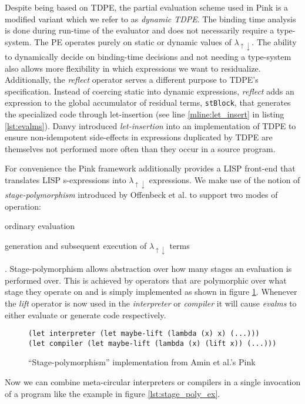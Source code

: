 \documentclass[a4paper,12pt,twoside,openright]{report}
\theoremstyle{definition}
\newcommand{\mslang}{$\lambda_{\uparrow\downarrow}$}
\begin{document}
Despite being based on TDPE, the partial evaluation scheme used in Pink is a modified variant which we refer to as \textit{dynamic TDPE}. The binding time analysis is done during run-time of the evaluator and does not necessarily require a type-system. The PE operates purely on static or dynamic values of \mslang{}. The ability to dynamically decide on binding-time decisions and not needing a type-system also allows more flexibility in which expressions we want to residualize. Additionally, the \textit{reflect} operator serves a different purpose to TDPE's specification. Instead of coercing static into dynamic expressions, \textit{reflect} adds an expression to the global accumulator of residual terms, \texttt{stBlock}, that generates the specialized code through let-insertion (see line \ref{mline:let_insert} in listing \ref{lst:evalms}). Danvy introduced \textit{let-insertion} into an implementation of TDPE \cite{hatcliff2007partial} to ensure non-idempotent side-effects in expressions duplicated by TDPE are themselves not performed more often than they occur in a source program.

For convenience the Pink framework additionally provides a LISP front-end that translates LISP s-expressions into \mslang{} expressions. We make use of the notion of \textit{stage-polymorphism} introduced by Offenbeck et al. \cite{ofenbeck2017staging} to support two modes of operation:
\begin{enumerate*}[label=(\arabic*)]
	\item ordinary evaluation
	\item generation and subsequent execution of \mslang{} terms
\end{enumerate*}.
Stage-polymorphism allows abstraction over how many stages an evaluation is performed over. This is achieved by operators that are polymorphic over what stage they operate on and is simply implemented as shown in figure \ref{lst:stage_poly_impl}. Whenever the \textit{lift} operator is now used in the \textit{interpreter} or \textit{compiler} it will cause \textit{evalms} to either evaluate or generate code respectively.

\begin{figure}[ht]
\centering
\begin{verbatim}
(let interpreter (let maybe-lift (lambda (x) x) (...)))
(let compiler (let maybe-lift (lambda (x) (lift x)) (...)))
\end{verbatim}
\caption{``Stage-polymorphism'' implementation from Amin et al.'s Pink \cite{amin2017collapsing}}
\label{lst:stage_poly_impl}
\end{figure}
Now we can combine meta-circular interpreters or compilers in a single invocation of a program like the example in figure \ref{lst:stage_poly_ex}.
\end{document}
